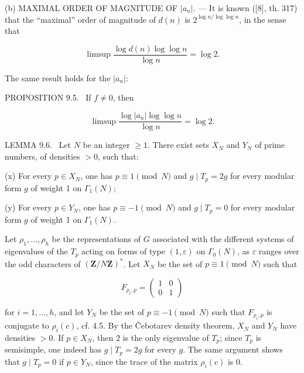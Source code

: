 \documentclass[10pt,oneside]{article}
\begin{document}
(b) MAXIMAL ORDER OF MAGNITUDE OF \(|a_n|\). — It is known ([8], th. 317) that the “maximal” order of magnitude of \(d(n)\) is \(2^{\log n/\log\log n}\), in the sense that\par

\begin{equation*}
\limsup\frac{\log d(n)\log\log n}{\log n}=\log2.
\end{equation*}

The same result holds for the \(|a_n|\):\par

\noindent\textsc{PROPOSITION 9.5.} \textemdash\ If \(f\neq0\), then\par

\begin{equation*}
\limsup\frac{\log|a_n|\log\log n}{\log n}=\log2.
\end{equation*}

\noindent\textsc{LEMMA 9.6.} \textemdash\ Let \(N\) be an integer \(\geq1\). There exist sets \(X_N\) and \(Y_N\) of prime numbers, of densities \(>0\), such that:\par

(x) For every \(p\in X_N\), one has \(p\equiv1\pmod N\) and \(g\mid T_p=2g\) for every modular form \(g\) of weight 1 on \(\Gamma_1(N)\);\par

(y) For every \(p\in Y_N\), one has \(p\equiv-1\pmod N\) and \(g\mid T_p=0\) for every modular form \(g\) of weight 1 on \(\Gamma_1(N)\).\par

Let \(\rho_1,\ldots,\rho_h\) be the representations of \(G\) associated with the different systems of eigenvalues of the \(T_p\) acting on forms of type \((1,\varepsilon)\) on \(\Gamma_0(N)\), as \(\varepsilon\) ranges over the odd characters of \((\mathbf{Z}/N\mathbf{Z})^*\). Let \(X_N\) be the set of \(p\equiv1\pmod N\) such that\par

\begin{equation*}
F_{\rho_i,p}=\begin{pmatrix}1&0\\0&1\end{pmatrix}
\end{equation*}

for \(i=1,\ldots,h\), and let \(Y_N\) be the set of \(p\equiv-1\pmod N\) such that \(F_{\rho_i,p}\) is conjugate to \(\rho_i(c)\), cf. 4.5. By the Čebotarev density theorem, \(X_N\) and \(Y_N\) have densities \(>0\). If \(p\in X_N\), then 2 is the only eigenvalue of \(T_p\); since \(T_p\) is semisimple, one indeed has \(g\mid T_p=2g\) for every \(g\). The same argument shows that \(g\mid T_p=0\) if \(p\in Y_N\), since the trace of the matrix \(\rho_i(c)\) is 0.\par
\end{document}
